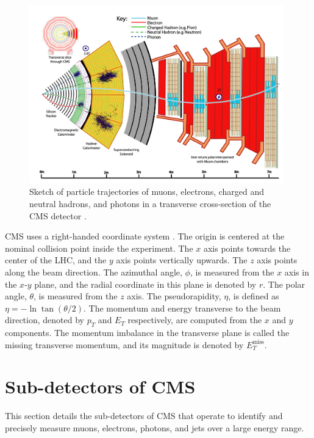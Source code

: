 \begin{figure}[ht]
    \centering
    \includegraphics[width=11cm]{figures/ch-2-cern-cms/sketch-cms-particle-interactions.png}
    \caption[Sketch of particle trajectories of muons, electrons, charged and neutral hadrons, and photons in a transverse cross-section of the CMS detector.]{Sketch of particle trajectories of muons, electrons, charged and neutral hadrons, and photons in a transverse cross-section of the CMS detector \cite{CERN-EP-2017-110}.}
    \label{fig:sketch-cms-particle-interactions}
\end{figure}

CMS uses a right-handed coordinate system \cite{CMS-2008-JINST-3-S08004}. The origin is centered at the nominal collision point inside the experiment. The $x$ axis points towards the center of the LHC, and the $y$ axis points vertically upwards. The $z$ axis points along the beam direction. The azimuthal angle, $\phi$, is measured from the $x$ axis in the $x$-$y$ plane, and the radial coordinate in this plane is denoted by $r$. The polar angle, $\theta$, is measured from the $z$ axis. The pseudorapidity, $\eta$, is defined as $\eta = -\ln \tan(\theta/2)$. The momentum and energy transverse to the beam direction, denoted by $p_{T}$ and $E_{T}$ respectively, are computed from the $x$ and $y$ components. The momentum imbalance in the transverse plane is called the missing transverse momentum, and its magnitude is denoted by $E_{T}^{\text{miss}}$.

\section{Sub-detectors of CMS}
This section details the sub-detectors of CMS that operate to identify and precisely measure muons, electrons, photons, and jets over a large energy range. 

